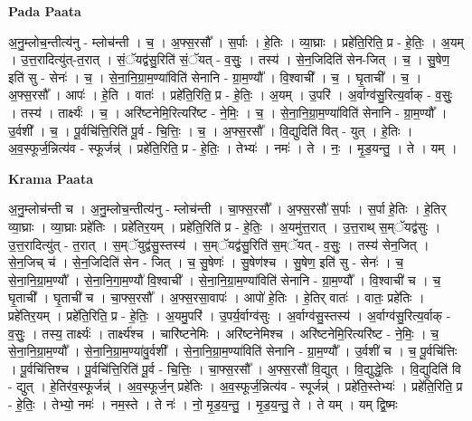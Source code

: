 \documentclass[17pt]{extarticle}
\begin{document}
\textbf{Pada Paata} \newline

अ॒नु॒म्लोच॒न्तीत्य॑नु - म्लोच॑न्ती । च॒ । अ॒फ्स॒रसौ᳚ । स॒र्पाः । हे॒तिः । व्या॒घ्राः । प्रहे॑ति॒रिति॒ प्र - हे॒तिः॒ । अ॒यम् । उ॒त्त॒रादित्यु॑त्-त॒रात् । सं॒ॅयद्व॑सु॒रिति॑ सं॒ॅयत् - व॒सुः॒ । तस्य॑ । से॒न॒जिदिति॑ सेन-जित् । च॒ । सु॒षेण॒ इति॑ सु - सेनः॑ । च॒ । से॒ना॒नि॒ग्रा॒म॒ण्या॑विति॑ सेनानि - ग्रा॒म॒ण्यौ᳚ । वि॒श्वाची᳚ । च॒ । घृ॒ताची᳚ । च॒ । अ॒फ्स॒रसौ᳚ । आपः॑ । हे॒ति । वातः॑ । प्रहे॑ति॒रिति॒ प्र - हे॒तिः॒ । अ॒यम् । उ॒परि॑ । अ॒र्वाग्व॑सु॒रित्य॒र्वाक् - व॒सुः॒ । तस्य॑ । तार्क्ष्यः॑ । च॒ । अरि॑ष्टनेमि॒रित्यरि॑ष्ट - ने॒मिः॒ । च॒ । से॒ना॒नि॒ग्रा॒म॒ण्या॑विति॑ सेनानि - ग्रा॒म॒ण्यौ᳚ । उ॒र्वशी᳚ । च॒ । पू॒र्वचि॑त्ति॒रिति॑ पू॒र्व - चि॒त्तिः॒ । च॒ । अ॒फ्स॒रसौ᳚ । वि॒द्युदिति॑ वित् - युत् । हे॒तिः । अ॒व॒स्फूर्ज॒न्नित्य॑व - स्फूर्जन्न्॑ । प्रहे॑ति॒रिति॒ प्र - हे॒तिः॒ । तेभ्यः॑ । नमः॑ । ते । नः॒ । मृ॒ड॒यन्तु॒ । ते । यम् ।  \newline


\textbf{Krama Paata} \newline

अ॒नु॒म्लोच॑न्ती च । अ॒नु॒म्लोच॒न्तीत्य॑नु - म्लोच॑न्ती । चा॒फ्स॒रसौ᳚ । अ॒फ्स॒रसौ॑ स॒र्पाः । स॒र्पा हे॒तिः । हे॒तिर् व्या॒घ्राः । व्या॒घ्राः प्रहे॑तिः । प्रहे॑तिर॒यम् । प्रहे॑ति॒रिति॑ प्र - हे॒तिः॒ । अ॒यमु॑त्त॒रात् । उ॒त्त॒राथ् स॒म्ॅयद्व॑सुः । उ॒त्त॒रादित्यु॑त् - त॒रात् । स॒म्ॅयुद्व॑सु॒स्तस्य॑ । स॒म्ॅयद्व॑सु॒रिति॑ स॒म्ॅयत् - व॒सुः॒ । तस्य॑ सेन॒जित् । से॒न॒जिच् च॑ । से॒न॒जिदिति॑ सेन - जित् । च॒ सु॒षेणः॑ । सु॒षेण॑श्च । सु॒षेण॒ इति॑ सु - सेनः॑ । च॒ से॒ना॒नि॒ग्रा॒म॒ण्यौ᳚ । से॒ना॒नि॒गा॒म॒ण्यौ॑ वि॒श्वाची᳚ । से॒ना॒नि॒ग्रा॒म॒ण्या॑विति॑ सेनानि - ग्रा॒म॒ण्यौ᳚ । वि॒श्वाची॑ च । च॒ घृ॒ताची᳚ । घृ॒ताची॑ च । चा॒फ्स॒रसौ᳚ । अ॒फ्स॒रसा॒वापः॑ । आपो॑ हे॒तिः । हे॒तिर् वातः॑ । वातः॒ प्रहे॑तिः । प्रहे॑तिर॒यम् । प्रहे॑ति॒रिति॒ प्र - हे॒तिः॒ । अ॒यमु॒परि॑ । उ॒पर्य॒र्वाग्व॑सुः । अ॒र्वाग्व॑सु॒स्तस्य॑ । अ॒र्वाग्व॑सु॒रित्य॒र्वाक् - व॒सुः॒ । तस्य॒ तार्क्ष्यः॑ । तार्क्ष्य॑श्च । चारि॑ष्टनेमिः । अरि॑ष्टनेमिश्च । अरि॑ष्टनेमि॒रित्यरि॑ष्ट - ने॒मिः॒ । च॒ से॒ना॒नि॒ग्रा॒म॒ण्यौ᳚ । से॒ना॒नि॒ग्रा॒म॒ण्या॑वु॒र्वशी᳚ । से॒ना॒नि॒ग्रा॒म॒ण्या॑विति॑ सेनानि - ग्रा॒म॒ण्यौ᳚ । उ॒र्वशी॑ च । च॒ पू॒र्वचि॑त्तिः । पू॒र्वचि॑त्तिश्च । पू॒र्वचि॑त्ति॒रिति॑ पू॒र्व - चि॒त्तिः॒ । चा॒फ्स॒रसौ᳚ । अ॒फ्स॒रसौ॑ वि॒द्युत् । वि॒द्युद्धे॒तिः । वि॒द्युदिति॑ वि - द्युत् । हे॒तिर॑व॒स्फूर्जन्न्॑ । अ॒व॒स्फूर्ज॒न् प्रहे॑तिः । अ॒व॒स्फूर्ज॒न्नित्य॑व - स्पूर्जन्न्॑ । प्रहे॑ति॒स्तेभ्यः॑ । प्रहे॑ति॒रिति॒ प्र - हे॒तिः॒ । तेभ्यो॒ नमः॑ । नम॒स्ते । ते नः॑ । नो॒ मृ॒ड॒य॒न्तु॒ । मृ॒ड॒य॒न्तु॒ ते । ते यम् । यम् द्वि॒ष्मः \newline
\end{document}
